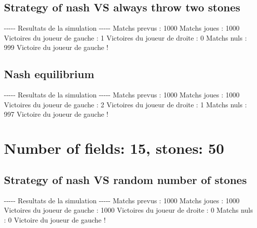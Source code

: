 \documentclass{article}%
\begin{document}
%
\subsection{Strategy of nash VS always throw two stones}%
\label{subsec:Strategy of nash VS always throw two stones}%
{-}{-}{-}{-}{-} Resultats de la simulation {-}{-}{-}{-}{-}\newline%
		\newline%
Matchs prevus : 1000\newline%
Matchs joues : 1000\newline%
\newline%
Victoires du joueur de gauche : 1\newline%
Victoires du joueur de droite : 0\newline%
Matchs nuls : 999\newline%
\newline%
Victoire du joueur de gauche !

%
\subsection{Nash equilibrium}%
\label{subsec:Nash equilibrium}%
{-}{-}{-}{-}{-} Resultats de la simulation {-}{-}{-}{-}{-}\newline%
		\newline%
Matchs prevus : 1000\newline%
Matchs joues : 1000\newline%
\newline%
Victoires du joueur de gauche : 2\newline%
Victoires du joueur de droite : 1\newline%
Matchs nuls : 997\newline%
\newline%
Victoire du joueur de gauche !

%
\section{Number of fields: 15, stones: 50}%
\label{sec:Number of fields 15, stones 50}%
\subsection{Strategy of nash VS random number of stones}%
\label{subsec:Strategy of nash VS random number of stones}%
{-}{-}{-}{-}{-} Resultats de la simulation {-}{-}{-}{-}{-}\newline%
		\newline%
Matchs prevus : 1000\newline%
Matchs joues : 1000\newline%
\newline%
Victoires du joueur de gauche : 1000\newline%
Victoires du joueur de droite : 0\newline%
Matchs nuls : 0\newline%
\newline%
Victoire du joueur de gauche !
\end{document}

